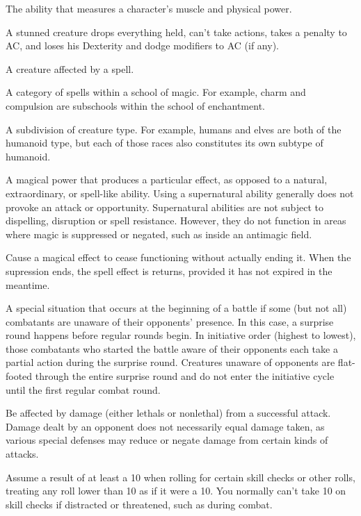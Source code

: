  The ability that measures a character's muscle and 
physical power. 

 A stunned creature drops everything held, can't take 
actions, takes a  penalty to AC, and loses his 
Dexterity and dodge modifiers to AC (if any). 

 A creature affected by a spell. 

 A category of spells within a school of magic. For example, 
charm and compulsion are subschools within the school of enchantment. 

 A subdivision  of creature type. For example, humans and elves are both  of the humanoid type, but each  of those races also constitutes its  own subtype of humanoid. 

 A magical power that produces a 
particular effect, as opposed to a natural, extraordinary, or spell-like 
ability. Using a supernatural ability generally does not provoke an 
attack or opportunity. Supernatural abilities are not subject to 
dispelling, disruption or spell resistance. However, they do not 
function in areas where magic is suppressed or negated, such as 
inside an antimagic field. 

 Cause a magical effect to cease functioning without 
actually ending it. When the supression ends, the spell effect is 
returns, provided it has not expired in the meantime. 

 A special situation that occurs at the beginning of a 
battle if some (but not all) combatants are unaware of their opponents' presence. In this case, a surprise round happens before 
regular rounds begin. In initiative order (highest to lowest), those 
combatants who started the battle aware of their opponents each 
take a partial action during the surprise round. Creatures unaware of 
opponents are flat-footed through the entire surprise round and do 
not enter the initiative cycle until the first regular combat round.  

 Be affected by damage (either lethals or nonlethal) 
from a successful attack. Damage dealt by an opponent does not 
necessarily equal damage taken, as various special defenses may 
reduce or negate damage from certain kinds of attacks. 

 Assume a result of at least a 10 when rolling for certain skill checks or other rolls, treating any roll lower than 10 as if it were a 10. You normally can't take 10 on skill checks if distracted or threatened, such as during combat. 

